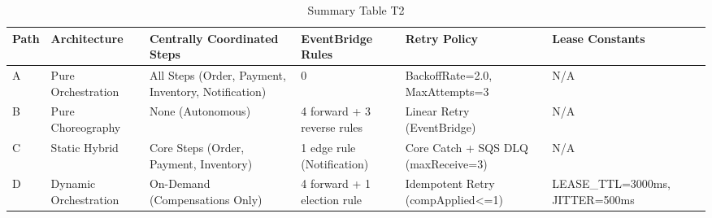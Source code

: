 \begin{table}[htbp]
\centering
\caption{Summary Table T2}
\label{tab:t2}
\begin{tabular}{llllll}
\toprule
Path & Architecture & Centrally Coordinated Steps & EventBridge Rules & Retry Policy & Lease Constants \\
\midrule
A & Pure Orchestration & All Steps (Order, Payment, Inventory, Notification) & 0 & BackoffRate=2.0, MaxAttempts=3 & N/A \\
B & Pure Choreography & None (Autonomous) & 4 forward + 3 reverse rules & Linear Retry (EventBridge) & N/A \\
C & Static Hybrid & Core Steps (Order, Payment, Inventory) & 1 edge rule (Notification) & Core Catch + SQS DLQ (maxReceive=3) & N/A \\
D & Dynamic Orchestration & On-Demand (Compensations Only) & 4 forward + 1 election rule & Idempotent Retry (compApplied<=1) & LEASE\_TTL=3000ms, JITTER=500ms \\
\bottomrule
\end{tabular}
\end{table}
